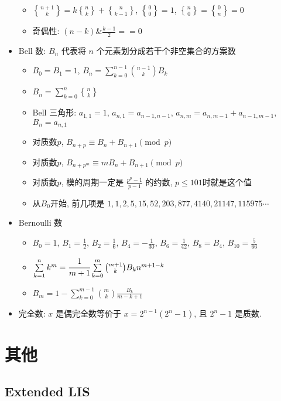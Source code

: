 \documentclass[landscape, twocolumn, 8pt, a4paper, twoside]{extarticle}
\newcommand{\stls}[2]{\genfrac{ \{ }{ \} }{0pt}{}{#1}{#2}}
\begin{document}
\begin{spacing}{0.1}
\begin{itemize}
\begin{itemize}
  \item $\stls{n + 1}{k} = k\stls{n}{k} + \stls{n}{k - 1}$, $\stls{0}{0} = 1$, $\stls{n}{0} = \stls{0}{n} = 0$
  \item 奇偶性: $(n - k) \& \frac{k - 1}{2} == 0$
  \end{itemize}
\item Bell 数: $B_n$ 代表将 $n$ 个元素划分成若干个非空集合的方案数
  \begin{itemize}
  \item $B_0 = B_1 = 1$, $B_n = \sum\limits_{k = 0}^{n - 1} \binom{n - 1}{k} B_k$
  \item $B_n = \sum\limits_{k = 0}^{n} \stls{n}{k} $
  \item Bell 三角形: $a_{1, 1} = 1$, $a_{n, 1} = a_{n - 1, n - 1}$, $a_{n, m} = a_{n, m - 1} + a_{n - 1, m - 1}$, $B_n = a_{n, 1}$
  \item 对质数$p$, $B_{n + p} \equiv B_n + B_{n + 1} \pmod{p}$
  \item 对质数$p$, $B_{n + p^m} \equiv mB_n + B_{n + 1} \pmod{p}$
  \item 对质数$p$, 模的周期一定是 $\frac{p^p - 1}{p - 1}$ 的约数, $p \le 101$时就是这个值
  \item 从$B_0$开始, 前几项是 $1, 1, 2, 5, 15, 52, 203, 877, 4140, 21147, 115975 \cdots$
  \end{itemize}
\item Bernoulli 数
  \begin{itemize}
  \item $B_0 = 1$, $B_1 = \frac{1}{2}$, $B_2 = \frac{1}{6}$, $B_4 = -\frac{1}{30}$, $B_6 = \frac{1}{42}$, $B_8 = B_4$, $B_{10} = \frac{5}{66}$
  \item $\sum\limits_{k = 1}^{n} k^m = \cfrac{1}{m + 1} \sum\limits_{k = 0}^{m} \binom{m + 1}{k} B_k n ^ {m + 1 - k} $
  \item $B_m = 1 - \sum\limits_{k = 0}^{m - 1} \binom{m}{k} \frac{B_k}{m - k + 1}$
  \end{itemize}
\item 完全数: $x$ 是偶完全数等价于 $x = 2^{n - 1} (2^n - 1)$, 且 $2^n - 1$ 是质数.
\end{itemize}

\section{其他}
\subsection{Extended LIS}



\end{spacing}
\end{document}
